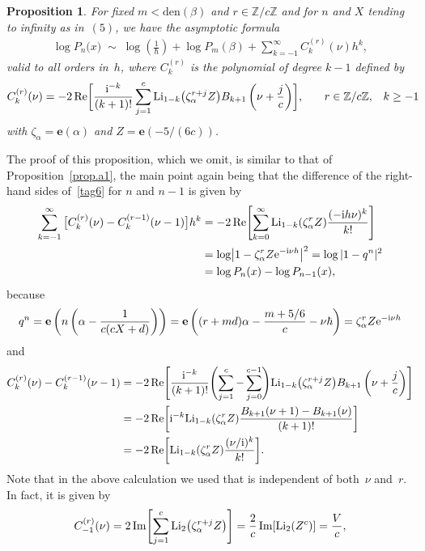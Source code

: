 \documentclass[pdftex]{sigma}
\numberwithin{equation}{section}
\newtheorem{Proposition}[Theorem]{Proposition}
\def\z{\zeta}
\def\e{\mathbf{e}}
\def\a{\alpha}
\def\Z{\mathbb Z}
\def\m{ - }
\def\si{\;\sim\;}
\def\e{\mathbf{e}}
\def\hb{\hbar}
\def\a{\alpha}
\def\b{\beta}
\def\z{\zeta}
\def\L{\text{{\rm Li}}}
\def\den{\mathrm{den}}
\begin{document}
\begin{Proposition}
\label{prop.a2}
For fixed $m<\den(\b)$ and $r\in\Z/c\Z$ and for $n$ and $X$ tending to
infinity as in~$(5)$, we have the asymptotic formula
\begin{gather}\label{tag6}
\log P_n\bigl(x\bigr) \si \log\left(\frac1\hb\right) + \log P_m(\b)
+ \sum_{k=-1}^\infty C_k^{(r)}(\nu) h^k ,
\end{gather}
valid to all orders in~$h$, where $C_k^{(r)}$ is the polynomial of degree
$k-1$ defined by
\begin{gather}
\label{tag7}
C_k^{(r)}(\nu) = - 2 \operatorname{Re}\biggl[\frac{{\rm i}^{-k}}{(k+1)!}
 \sum_{j=1}^c \L_{1-k}\big(\z_\a^{r+j}Z\big) B_{k+1}\left(\nu+\frac jc\right)\biggr],
\qquad\! r\in\Z/c\Z, \quad\! k\ge-1\!\!\!
\end{gather}
with $\z_\a=\e(\a)$ and $Z=\e(-5/(6c))$.
\end{Proposition}
The proof of this proposition, which we omit, is similar to that of
Proposition~\ref{prop.a1}, the main point again being that the difference
of the right-hand sides of~\eqref{tag6} for $n$ and $n-1$ is given by
\begin{align*}
\sum_{k=-1}^\infty \big[C_k^{(r)}(\nu)\m C_k^{(r-1)}(\nu-1)\big] h^k
& = - 2 \operatorname{Re}\Biggl[\sum_{k=0}^\infty \L_{1-k}(\z_\a^rZ)
\frac{(-{\rm i}h\nu)^k}{k!}\Biggr] \\
 &
= \log\bigl|1\m\z_\a^rZ{\rm e}^{-{\rm i}\nu h}\bigr|^2 = \log|1-q^n|^2 \\ &
= \log P_n(x) \m \log P_{n-1}(x) ,
\end{align*}
because
\[
q^n = \e\left(n\left(\a\m\frac1{c(cX+d)}\right)\right) =
\e\left((r+md)\a\m\frac{m+5/6}c\m\nu\hb\right) = \z_\a^rZ{\rm e}^{-{\rm i}\nu h}
\]
and
\begin{align*}
C_k^{(r)}(\nu) \m C_k^{(r-1)}(\nu-1) &
= - 2 \operatorname{Re}\Biggl[\frac{{\rm i}^{-k}}{(k+1)!}
 \Biggl(\sum_{j=1}^c\m\sum_{j=0}^{c-1} \Biggr)
\L_{1-k}\big(\z_\a^{r+j}Z\big) B_{k+1}\left(\nu+\frac jc\right)\Biggr] \\
 & = - 2 \operatorname{Re}\biggl[{\rm i}^{-k}\L_{1-k}(\z_\a^rZ) \frac{B_{k+1}
(\nu+1)\m B_{k+1}(\nu)}{(k+1)!}\biggr] \\ &
 = - 2 \operatorname{Re}\biggl[  \L_{1-k}(\z_\a^rZ) \frac{(\nu/{\rm i})^k}{k!} \biggr] .
\end{align*}
Note that in the above calculation we used that  is
independent of both~$\nu$ and~$r$. In fact, it is given by
\[
C_{-1}^{(r)}(\nu) = 2 \operatorname{Im}\Biggl[\sum_{j=1}^c \L_2\big(\z_\a^{r+j}Z\big)\Biggr]
 = \frac2c \operatorname{Im}[\L_2(Z^c)] = \frac V c ,
\]
\end{document}
